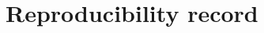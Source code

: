 \begin{table}[!htbp]
\centering\footnotesize
\caption{The first full run's tables, for the record: history, not results (the note names the run).}
\label{tab:TabF8}

\end{table}

\clearpage

\section{Reproducibility record}\label{app:repro}

